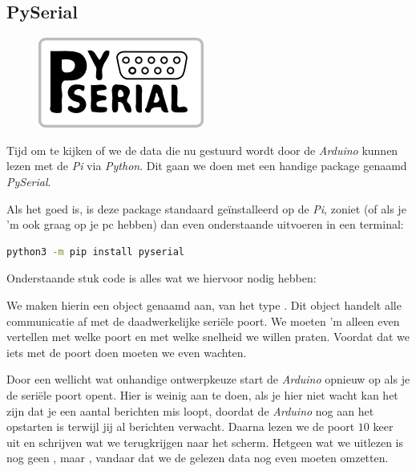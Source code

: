\subsection{PySerial}

\begin{figure}[h!]
\centering\includegraphics[scale=0.75]{Pictures/chapter08/pyserial.png}
\label{fig:pyserial} %
\end{figure}

Tijd om te kijken of we de data die nu gestuurd wordt door de \textit{Arduino} kunnen lezen met de \textit{Pi} via \textit{Python}. Dit gaan we doen met een handige package genaamd \textit{PySerial}. 

\begin{remark}
  Als het goed is, is deze package standaard geïnstalleerd op de \textit{Pi}, zoniet (of als je 'm ook graag op je pc hebben) dan even onderstaande uitvoeren in een terminal:
  \begin{lstlisting}[language=bash]
    python3 -m pip install pyserial
  \end{lstlisting}
\end{remark}

Onderstaande stuk code is alles wat we hiervoor nodig hebben:

We maken hierin een object genaamd  aan, van het type . Dit object handelt alle communicatie af met de daadwerkelijke seriële poort. We moeten 'm alleen even vertellen met welke poort en met welke snelheid we willen praten.
Voordat dat we iets met de poort doen moeten we even wachten.  

Door een wellicht wat onhandige ontwerpkeuze start de \textit{Arduino} opnieuw op als je de seriële poort opent. Hier is weinig aan te doen, als je hier niet wacht kan het zijn dat je een aantal berichten mis loopt, doordat de \textit{Arduino} nog aan het opstarten is terwijl jij al berichten verwacht. Daarna lezen we de poort $10$ keer uit en schrijven wat we terugkrijgen naar het scherm. Hetgeen wat we uitlezen is nog geen , maar , vandaar dat we de gelezen data nog even moeten omzetten. 


